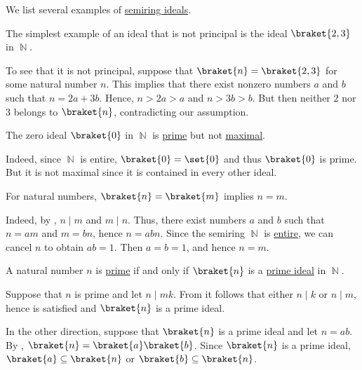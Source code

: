 \begin{example}\label{ex:def:semiring_ideal}
  We list several examples of \hyperref[def:semiring_ideal]{semiring ideals}.
  \begin{thmenum}
     The simplest example of an ideal that is not principal is the ideal \( \braket{ 2, 3 } \) in \( \BbbN \).

    To see that it is not principal, suppose that \( \braket{ n } = \braket{ 2, 3 } \) for some natural number \( n \). This implies that there exist nonzero numbers \( a \) and \( b \) such that \( n = 2a + 3b \). Hence, \( n > 2a > a \) and \( n > 3b > b \). But then neither \( 2 \) nor \( 3 \) belongs to \( \braket{ n } \), contradicting our assumption.

     The zero ideal \( \braket{ 0 } \) in \( \BbbN \) is \hyperref[def:semiring_ideal/prime]{prime} but not \hyperref[def:semiring_ideal/maximal]{maximal}.

    Indeed, since \( \BbbN \) is entire, \( \braket{ 0 } = \set{ 0 } \) and thus \( \braket{ 0 } \) is prime. But it is not maximal since it is contained in every other ideal.

     For natural numbers, \( \braket{ n } = \braket{ m } \) implies \( n = m \).

    Indeed, by , \( n \mid m \) and \( m \mid n \). Thus, there exist numbers \( a \) and \( b \) such that \( n = am \) and \( m = bn \), hence \( n = abn \). Since the semiring \( \BbbN \) is \hyperref[def:entire_semiring]{entire}, we can cancel \( n \) to obtain \( ab = 1 \). Then \( a = b = 1 \), and hence \( n = m \).

     A natural number \( n \) is \hyperref[def:prime_number]{prime} if and only if \( \braket{n} \) is a \hyperref[def:semiring_ideal/prime]{prime ideal} in \( \BbbN \).

    Suppose that \( n \) is prime and let \( n \mid mk \). From  it follows that either \( n \mid k \) or \( n \mid m \), hence  is satisfied and \( \braket{ n } \) is a prime ideal.

    In the other direction, suppose that \( \braket{ n } \) is a prime ideal and let \( n = ab \). By , \( \braket{ n } = \braket{ a } \braket{ b } \). Since \( \braket{ n } \) is a prime ideal, \( \braket{ a } \subseteq \braket{ n } \) or \( \braket{ b } \subseteq \braket{ n } \).


\end{thmenum}
\end{example}
